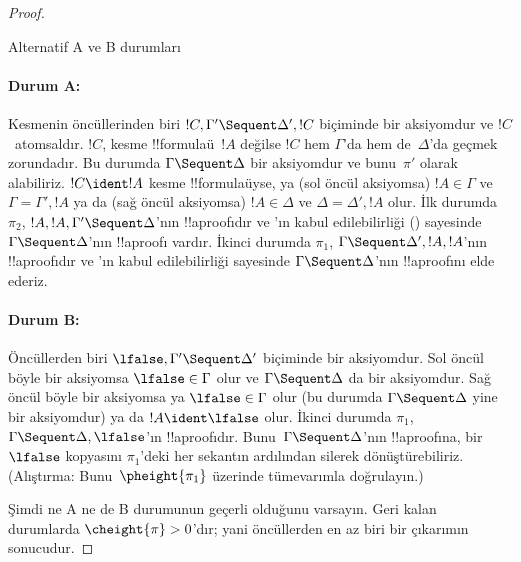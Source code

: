 \documentclass[../../../include/open-logic-section]{subfiles}
\begin{document}
\begin{proof}
\begin{center}
Alternatif A ve B durumları
\end{center}

\paragraph{Durum A:} Kesmenin öncüllerinden biri
$!C, \Gamma' \Sequent \Delta', !C$ biçiminde bir aksiyomdur ve
$!C$~atomsaldır.
$!C$, kesme !!{formula}{}ü~$!A$ değilse $!C$ hem $\Gamma$'da hem
de~$\Delta$'da geçmek zorundadır. Bu durumda
$\Gamma \Sequent \Delta$ bir aksiyomdur ve bunu~$\pi'$ olarak
alabiliriz. $!C \ident !A$ kesme !!{formula}{}üyse, ya (sol öncül
aksiyomsa) $!A \in \Gamma$ ve $\Gamma = \Gamma', !A$ ya da (sağ
öncül aksiyomsa) $!A \in \Delta$ ve $\Delta = \Delta', !A$ olur.
İlk durumda $\pi_2$, $!A, !A, \Gamma' \Sequent \Delta$'nın
!!a{proof}{}ıdır ve \LeftR{\Contraction}'ın kabul edilebilirliği
() sayesinde
$\Gamma \Sequent \Delta$'nın !!a{proof}{}ı vardır. İkinci durumda
$\pi_1$, $\Gamma \Sequent \Delta', !A, !A$'nın !!a{proof}{}ıdır ve
\RightR{\Contraction}'ın kabul edilebilirliği sayesinde
$\Gamma \Sequent \Delta$'nın !!a{proof}{}ını elde ederiz.

\paragraph{Durum B:} Öncüllerden biri
$\lfalse, \Gamma' \Sequent \Delta'$ biçiminde bir aksiyomdur.
Sol öncül böyle bir aksiyomsa $\lfalse \in \Gamma$ olur ve
$\Gamma \Sequent \Delta$ da bir aksiyomdur. Sağ öncül böyle bir
aksiyomsa ya $\lfalse \in \Gamma$ olur (bu durumda
$\Gamma \Sequent \Delta$ yine bir aksiyomdur) ya da
$!A \ident \lfalse$ olur. İkinci durumda $\pi_1$,
$\Gamma \Sequent \Delta, \lfalse$'ın !!a{proof}{}ıdır.
Bunu~$\Gamma \Sequent \Delta$'nın !!a{proof}{}ına, bir $\lfalse$
kopyasını $\pi_1$'deki her sekantın ardılından silerek dönüştürebiliriz.
(Alıştırma: Bunu~$\pheight{\pi_1}$ üzerinde tümevarımla doğrulayın.)

Şimdi ne A ne de B durumunun geçerli olduğunu varsayın. Geri kalan
durumlarda $\cheight{\pi} > 0$'dır; yani öncüllerden en az biri bir
çıkarımın sonucudur.


\end{proof}
\end{document}
